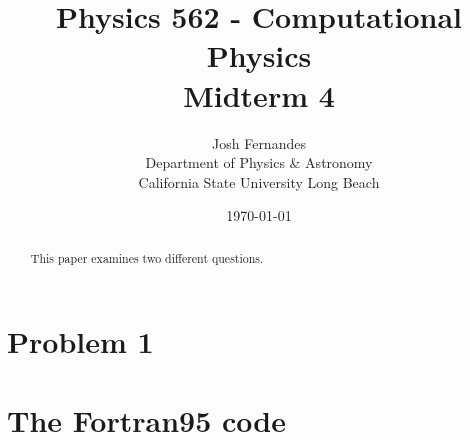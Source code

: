 \documentclass[12pt]{article}
\begin{document}




\title{Physics 562 - Computational Physics\\[.5cm]
Midterm 4}
\author{Josh Fernandes\\
Department of Physics \& Astronomy\\
California State University Long Beach}
\date{\today}

  
\maketitle



\begin{abstract}
This paper examines two different questions. 
\end{abstract}


\section{Problem 1}

\section{The Fortran95 code}
\end{document}

